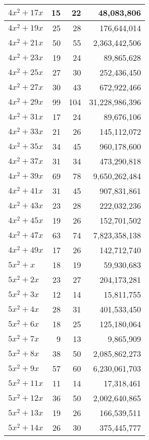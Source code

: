 \documentclass[a4paper]{amsproc}
\theoremstyle{plain}
\begin{document}
\begin{longtable}{ | l | r | r | r | }
$4x^2 + 17x$ & 15 & 22 & 48{,}083{,}806 \\ \hline
$4x^2 + 19x$ & 25 & 28 & 176{,}644{,}014 \\ \hline
$4x^2 + 21x$ & 50 & 55 & 2{,}363{,}442{,}506 \\ \hline
$4x^2 + 23x$ & 19 & 24 & 89{,}865{,}628 \\ \hline
$4x^2 + 25x$ & 27 & 30 & 252{,}436{,}450 \\ \hline
$4x^2 + 27x$ & 30 & 43 & 672{,}922{,}466 \\ \hline
$4x^2 + 29x$ & 99 & 104 & 31{,}228{,}986{,}396 \\ \hline
$4x^2 + 31x$ & 17 & 24 & 89{,}676{,}106 \\ \hline
$4x^2 + 33x$ & 21 & 26 & 145{,}112{,}072 \\ \hline
$4x^2 + 35x$ & 34 & 45 & 960{,}178{,}600 \\ \hline
$4x^2 + 37x$ & 31 & 34 & 473{,}290{,}818 \\ \hline
$4x^2 + 39x$ & 69 & 78 & 9{,}650{,}262{,}484 \\ \hline
$4x^2 + 41x$ & 31 & 45 & 907{,}831{,}861 \\ \hline
$4x^2 + 43x$ & 23 & 28 & 222{,}032{,}236 \\ \hline
$4x^2 + 45x$ & 19 & 26 & 152{,}701{,}502 \\ \hline
$4x^2 + 47x$ & 63 & 74 & 7{,}823{,}358{,}138 \\ \hline
$4x^2 + 49x$ & 17 & 26 & 142{,}712{,}740 \\ \hline
$5x^2 + x$ & 18 & 19 & 59{,}930{,}683 \\ \hline
$5x^2 + 2x$ & 23 & 27 & 204{,}173{,}281 \\ \hline
$5x^2 + 3x$ & 12 & 14 & 15{,}811{,}755 \\ \hline
$5x^2 + 4x$ & 28 & 31 & 401{,}533{,}450 \\ \hline
$5x^2 + 6x$ & 18 & 25 & 125{,}180{,}064 \\ \hline
$5x^2 + 7x$ & 9 & 13 & 9{,}865{,}909 \\ \hline
$5x^2 + 8x$ & 38 & 50 & 2{,}085{,}862{,}273 \\ \hline
$5x^2 + 9x$ & 57 & 60 & 6{,}230{,}061{,}703 \\ \hline
$5x^2 + 11x$ & 11 & 14 & 17{,}318{,}461 \\ \hline
$5x^2 + 12x$ & 36 & 50 & 2{,}002{,}640{,}865 \\ \hline
$5x^2 + 13x$ & 19 & 26 & 166{,}539{,}511 \\ \hline
$5x^2 + 14x$ & 26 & 30 & 375{,}445{,}777 \\ \hline

\end{longtable}
\end{document}
